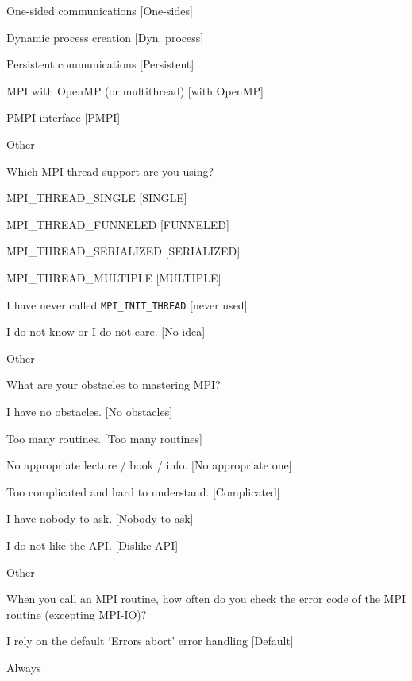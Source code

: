 \documentclass[preprint,5p,times]{elsarticle}
\begin{document}
{{\begin{description}
\begin{inparaenum}[{\bf C}1)]
    \item One-sided communications [One-sides]
    \item Dynamic process creation [Dyn. process]
    \item Persistent communications [Persistent]
    \item MPI with OpenMP (or multithread) [with OpenMP]
    \item PMPI interface [PMPI]
    \item Other
    \end{inparaenum}
  \item[Q18*:] Which MPI thread support are you using?
    \begin{inparaenum}[{\bf C}1)]
    \item MPI\_THREAD\_SINGLE [SINGLE]
    \item MPI\_THREAD\_FUNNELED [FUNNELED]
    \item MPI\_THREAD\_SERIALIZED [SERIALIZED]
    \item MPI\_THREAD\_MULTIPLE [MULTIPLE]
    \item I have never called {\tt MPI\_INIT\_THREAD} [never used]
    \item I do not know or I do not care. [No idea]
    \item Other
    \end{inparaenum}
  \item[Q19*:] What are your obstacles to mastering MPI?
    \begin{inparaenum}[{\bf C}1)]
    \item I have no obstacles. [No obstacles]
    \item Too many routines. [Too many routines]
    \item No appropriate lecture / book / info. [No appropriate one]
    \item Too complicated and hard to understand. [Complicated]
    \item I have nobody to ask. [Nobody to ask]
    \item I do not like the API. [Dislike API]
    \item Other
    \end{inparaenum}
  \item[Q20:] When you call an MPI routine, how often do you check the error code of the MPI routine  (excepting MPI-IO)?
    \begin{inparaenum}[{\bf C}1)]
    \item I rely on the default ‘Errors abort’ error handling [Default]
    \item Always

\end{inparaenum}
\end{description}}}
\end{document}
